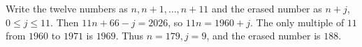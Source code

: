 Write the twelve numbers as $n,n+1,\ldots,n+11$ and the erased number as $n+j$, $0\le j\le11$. Then $11n+66-j=2026$, so $11n=1960+j$. The only multiple of $11$ from $1960$ to $1971$ is $1969$. Thus $n=179,j=9$, and the erased number is $\boxed{188}$.
